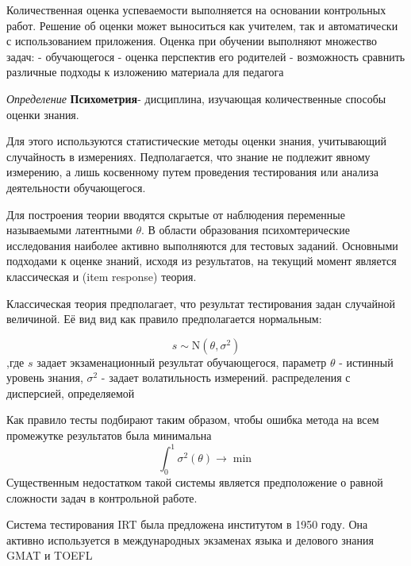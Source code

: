 
Количественная оценка успеваемости выполняется на основании контрольных работ. Решение об оценки может выноситься как учителем, так и автоматически с использованием приложения. Оценка при обучении выполняют множество задач:
- обучающегося
- оценка перспектив его родителей
- возможность сравнить различные подходы к изложению материала для педагога 


\textit{Определение} \textbf{Психометрия}- дисциплина, изучающая количественные способы оценки знания.

Для этого используются статистические методы оценки знания, учитывающий случайность в измерениях.
Педполагается, что знание не подлежит явному измерению,
а лишь косвенному путем проведения тестирования или анализа деятельности обучающегося.


Для построения теории вводятся скрытые от наблюдения переменные называемыми латентными $\theta$.
В области образования психомтерические исследования наиболее активно выполняются для тестовых заданий. 
Основными подходами к оценке знаний, исходя из результатов, 
на текущий момент является классическая и (item response) теория.

Классическая теория предполагает, что результат тестирования задан случайной величиной. Её вид вид как правило предполагается нормальным:

\begin{equation}
    s \sim \mathrm{N}(\theta,\sigma^2)  
\end{equation}
,где $s$ задает экзаменационный результат обучающегося, параметр $\theta$ - истинный уровень знания, $\sigma^2$ - задает волатильность измерений. распределения с дисперсией, определяемой 

Как правило тесты подбирают таким образом, чтобы ошибка метода на всем промежутке результатов была минимальна
$$
    \int_0^1 \sigma^2(\theta) \rightarrow \min
$$
Существенным недостатком такой системы является предположение о равной сложности задач в контрольной работе.


Система тестирования IRT была предложена институтом в 1950 году. Она активно используется в международных экзаменах языка
и делового знания GMAT и TOEFL


